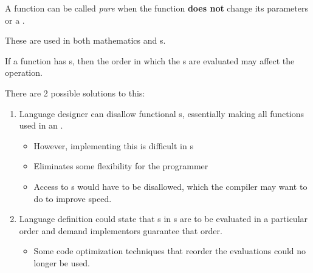 \begin{definition}[Pure]\label{def:Function_Pure}
  A function can be called \emph{pure} when the function \textbf{does not} change its parameters or a .

  \begin{remark}
    These are used in both mathematics and s.
  \end{remark}
\end{definition}
If a function has s, then the order in which the s are evaluated may affect the operation.

There are 2 possible solutions to this:
\begin{enumerate}[noitemsep]
\item Language designer can disallow functional s, essentially making all functions used in an  .
  \begin{itemize}[noitemsep]
  \item However, implementing this is difficult in s
  \item Eliminates some flexibility for the programmer
  \item Access to s would have to be disallowed, which the compiler may want to do to improve speed.
  \end{itemize}
\item Language definition could state that s in s are to be evaluated in a particular order and demand implementors guarantee that order.
  \begin{itemize}[noitemsep]
  \item Some code optimization techniques that reorder the  evaluations could no longer be used.
  \end{itemize}
\end{enumerate}


